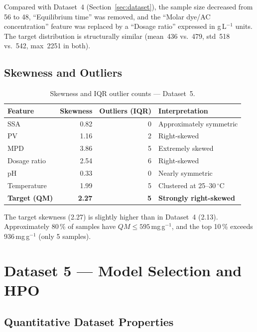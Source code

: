 \documentclass[12pt,a4paper]{article}
\begin{document}
Compared with Dataset~4 (Section~\ref{sec:dataset}), the sample size
decreased from 56 to 48, ``Equilibrium time'' was removed, and the
``Molar dye/AC concentration'' feature was replaced by a ``Dosage ratio''
expressed in g\,L$^{-1}$ units.  The target distribution is structurally
similar (mean~436 vs.\ 479, std~518 vs.\ 542, max~2251 in both).

\subsection{Skewness and Outliers}

\begin{table}[h]
\centering
\caption{Skewness and IQR outlier counts — Dataset~5.}
\label{tab:ds5_skewness}
\small
\begin{tabular}{lrrl}
\toprule
Feature & Skewness & Outliers (IQR) & Interpretation \\
\midrule
SSA                      & 0.82 & 0 & Approximately symmetric \\
PV                       & 1.16 & 2 & Right-skewed \\
MPD                      & 3.86 & 5 & Extremely skewed \\
Dosage ratio             & 2.54 & 6 & Right-skewed \\
pH                       & 0.33 & 0 & Nearly symmetric \\
Temperature              & 1.99 & 5 & Clustered at 25--30\,$^\circ$C \\
\textbf{Target (QM)}     & \textbf{2.27} & \textbf{5} & \textbf{Strongly right-skewed} \\
\bottomrule
\end{tabular}
\end{table}

The target skewness (2.27) is slightly higher than in Dataset~4 (2.13).
Approximately 80\,\% of samples have $QM \leq 595$\,mg\,g$^{-1}$, and
the top 10\,\% exceeds 936\,mg\,g$^{-1}$ (only 5 samples).

\section{Dataset 5 — Model Selection and HPO}
\label{sec:ds5_model_selection}

\subsection{Quantitative Dataset Properties}
\end{document}
